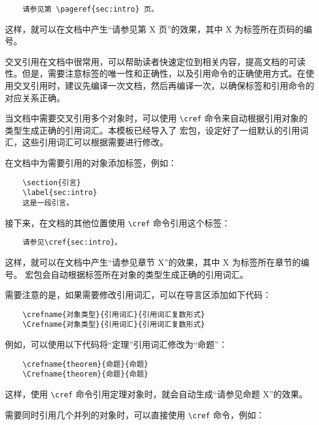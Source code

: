 \begin{Verbatim}
    请参见第 \pageref{sec:intro} 页。
\end{Verbatim}

这样，就可以在文档中产生“请参见第 X 页”的效果，其中 X 为标签所在页码的编号。

交叉引用在文档中很常用，可以帮助读者快速定位到相关内容，提高文档的可读性。但是，需要注意标签的唯一性和正确性，以及引用命令的正确使用方式。在使用交叉引用时，建议先编译一次文档，然后再编译一次，以确保标签和引用命令的对应关系正确。

当文档中需要交叉引用多个对象时，可以使用 \verb|\cref| 命令来自动根据引用对象的类型生成正确的引用词汇。本模板已经导入了  宏包，设定好了一组默认的引用词汇，这些引用词汇可以根据需要进行修改。

在文档中为需要引用的对象添加标签，例如：

\begin{Verbatim}
    \section{引言}
    \label{sec:intro}
    这是一段引言。
\end{Verbatim}

接下来，在文档的其他位置使用 \verb|\cref| 命令引用这个标签：

\begin{Verbatim}
    请参见\cref{sec:intro}。
\end{Verbatim}

这样，就可以在文档中产生“请参见章节 X”的效果，其中 X 为标签所在章节的编号。 宏包会自动根据标签所在对象的类型生成正确的引用词汇。

需要注意的是，如果需要修改引用词汇，可以在导言区添加如下代码：

\begin{Verbatim}
    \crefname{对象类型}{引用词汇}{引用词汇复数形式}
    \Crefname{对象类型}{引用词汇}{引用词汇复数形式}
\end{Verbatim}

例如，可以使用以下代码将“定理”引用词汇修改为“命题”：

\begin{Verbatim}
    \crefname{theorem}{命题}{命题}
    \Crefname{theorem}{命题}{命题}
\end{Verbatim}

这样，使用 \verb|\cref| 命令引用定理对象时，就会自动生成“请参见命题 X”的效果。

需要同时引用几个并列的对象时，可以直接使用 \verb|\cref| 命令，例如：


